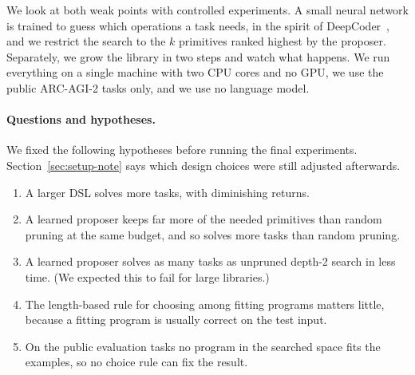 \documentclass[sigconf,nonacm]{acmart}
\begin{document}
We look at both weak points with controlled experiments. A small neural network is trained to guess which operations a task needs, in the spirit of DeepCoder~\cite{balog2016deepcoder}, and we restrict the search to the $k$ primitives ranked highest by the proposer. Separately, we grow the library in two steps and watch what happens. We run everything on a single machine with two CPU cores and no GPU, we use the public ARC-AGI-2 tasks only, and we use no language model.

\paragraph{Questions and hypotheses.} We fixed the following hypotheses before running the final experiments. Section~\ref{sec:setup-note} says which design choices were still adjusted afterwards.
\begin{enumerate}
  \item[\textbf{H1}] A larger DSL solves more tasks, with diminishing returns.
  \item[\textbf{H2}] A learned proposer keeps far more of the needed primitives than random pruning at the same budget, and so solves more tasks than random pruning.
  \item[\textbf{H3}] A learned proposer solves as many tasks as unpruned depth-2 search in less time. (We expected this to fail for large libraries.)
  \item[\textbf{H4}] The length-based rule for choosing among fitting programs matters little, because a fitting program is usually correct on the test input.
  \item[\textbf{H5}] On the public evaluation tasks no program in the searched space fits the examples, so no choice rule can fix the result.
\end{enumerate}
\end{document}
